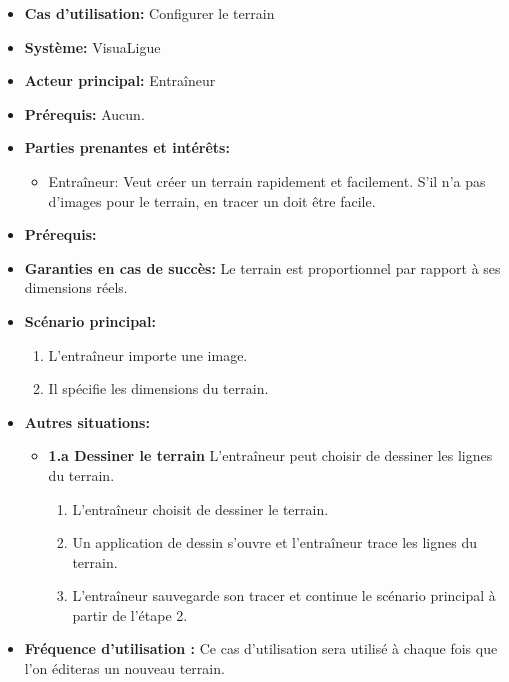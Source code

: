 \begin{itemize}
    \item \textbf{Cas d'utilisation:} Configurer le terrain
    \item \textbf{Syst\`eme:} VisuaLigue
    \item \textbf{Acteur principal:} Entra\^ineur
    \item \textbf{Pr\'erequis:} Aucun.
    \item \textbf{Parties prenantes et int\'er\^ets:}
        \begin{itemize}
            \item Entraîneur: Veut créer un terrain rapidement et facilement. S'il n'a pas d'images pour le terrain, en tracer un doit être facile.
        \end{itemize}
    \item \textbf{Pr\'erequis:}
    \item \textbf{Garanties en cas de succ\`es:} Le terrain est proportionnel par rapport à ses dimensions réels.
    \item \textbf{Sc\'enario principal:}
        \begin{enumerate}
            \item L'entraîneur importe une image.
            \item Il spécifie les dimensions du terrain.
    \end{enumerate}
    \item \textbf{Autres situations:}
        \begin{itemize}
            \item \textbf{1.a Dessiner le terrain} L'entraîneur peut choisir de dessiner les lignes du terrain.
                \begin{enumerate}
                    \item L'entraîneur choisit de dessiner le terrain.
                    \item Un application de dessin s'ouvre et l'entraîneur trace les lignes du terrain.
                    \item L'entraîneur sauvegarde son tracer et continue le scénario principal à partir de l'étape 2.
               \end{enumerate}
 
        \end{itemize}
  	\item \textbf{Fréquence d'utilisation :} Ce cas d'utilisation sera utilisé à chaque fois que l'on éditeras un nouveau terrain.
\end{itemize}



